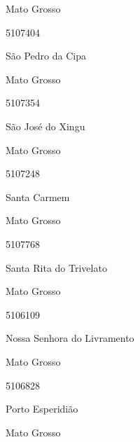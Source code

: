 \documentclass[
  letterpaper,
]{report}
\begin{document}
\n      

Mato Grosso

\n      

5107404

\n      

São Pedro da Cipa

\n    

\n    

\n      

Mato Grosso

\n      

5107354

\n      

São José do Xingu

\n    

\n    

\n      

Mato Grosso

\n      

5107248

\n      

Santa Carmem

\n    

\n    

\n      

Mato Grosso

\n      

5107768

\n      

Santa Rita do Trivelato

\n    

\n    

\n      

Mato Grosso

\n      

5106109

\n      

Nossa Senhora do Livramento

\n    

\n    

\n      

Mato Grosso

\n      

5106828

\n      

Porto Esperidião

\n    

\n    

\n      

Mato Grosso

\n      
\end{document}
